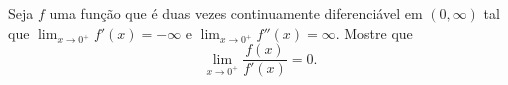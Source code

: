 Seja \(f\) uma função que é duas vezes continuamente diferenciável em \((0,\infty)\) tal que \(\lim_{x \to 0^{+}}f'(x)=-\infty\) e \(\lim_{x \to 0^{+}}f''(x)=\infty\). Mostre que
\[\lim_{x\to 0^{+}}\frac{f(x)}{f'(x)}=0.\]
